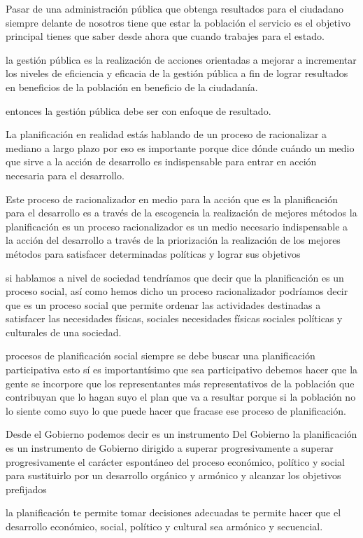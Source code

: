 \documentclass[
  letterpaper,
  DIV=11,
  numbers=noendperiod]{scrartcl}
\begin{document}
Pasar de una administración pública que obtenga resultados para el
ciudadano siempre delante de nosotros tiene que estar la población el
servicio es el objetivo principal tienes que saber desde ahora que
cuando trabajes para el estado.

la gestión pública es la realización de acciones orientadas a mejorar a
incrementar los niveles de eficiencia y eficacia de la gestión pública a
fin de lograr resultados en beneficios de la población en beneficio de
la ciudadanía.

entonces la gestión pública debe ser con enfoque de resultado.

La planificación en realidad estás hablando de un proceso de
racionalizar a mediano a largo plazo por eso es importante porque dice
dónde cuándo un medio que sirve a la acción de desarrollo es
indispensable para entrar en acción necesaria para el desarrollo.

Este proceso de racionalizador en medio para la acción que es la
planificación para el desarrollo es a través de la escogencia la
realización de mejores métodos la planificación es un proceso
racionalizador es un medio necesario indispensable a la acción del
desarrollo a través de la priorización la realización de los mejores
métodos para satisfacer determinadas políticas y lograr sus objetivos

si hablamos a nivel de sociedad tendríamos que decir que la
planificación es un proceso social, así como hemos dicho un proceso
racionalizador podríamos decir que es un proceso social que permite
ordenar las actividades destinadas a satisfacer las necesidades físicas,
sociales necesidades físicas sociales políticas y culturales de una
sociedad.

procesos de planificación social siempre se debe buscar una
planificación participativa esto sí es importantísimo que sea
participativo debemos hacer que la gente se incorpore que los
representantes más representativos de la población que contribuyan que
lo hagan suyo el plan que va a resultar porque si la población no lo
siente como suyo lo que puede hacer que fracase ese proceso de
planificación.

Desde el Gobierno podemos decir es un instrumento Del Gobierno la
planificación es un instrumento de Gobierno dirigido a superar
progresivamente a superar progresivamente el carácter espontáneo del
proceso económico, político y social para sustituirlo por un desarrollo
orgánico y armónico y alcanzar los objetivos prefijados

la planificación te permite tomar decisiones adecuadas te permite hacer
que el desarrollo económico, social, político y cultural sea armónico y
secuencial.
\end{document}
